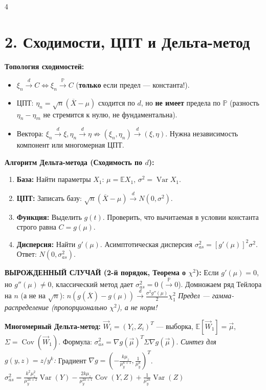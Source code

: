 \documentclass[8pt, a4paper, landscape]{extarticle}
\newcommand{\E}{\mathbb{E}}
\renewcommand{\P}{\mathbb{P}}
\DeclareMathOperator{\Var}{Var}
\DeclareMathOperator{\Cov}{Cov}
\begin{document}
\begin{multicols*}{4}
\section*{2. Сходимости, ЦПТ и Дельта-метод}
\textbf{Топология сходимостей:}
\begin{itemize}
    \item $\xi_n \xrightarrow{d} C \iff \xi_n \xrightarrow{\P} C$ (\textbf{только} если предел --- константа!).
    \item ЦПТ: $\eta_n = \sqrt{n}(\overline{X} - \mu)$ сходится по $d$, но \textbf{не имеет} предела по $\P$ (разность $\eta_n - \eta_m$ не стремится к нулю, не фундаментальна).
    \item Вектора: $\xi_n \xrightarrow{d} \xi, \eta_n \xrightarrow{d} \eta \not\Rightarrow (\xi_n, \eta_n) \xrightarrow{d} (\xi, \eta)$. Нужна независимость компонент или многомерная ЦПТ.
\end{itemize}

\textbf{Алгоритм Дельта-метода (Сходимость по $d$):}
\begin{enumerate}
    \item \textbf{База:} Найти параметры $X_1$: $\mu = \E X_1$, $\sigma^2 = \Var X_1$.
    \item \textbf{ЦПТ:} Записать базу: $\sqrt{n}(\overline{X} - \mu) \xrightarrow{d} N(0, \sigma^2)$.
    \item \textbf{Функция:} Выделить $g(t)$. Проверить, что вычитаемая в условии константа строго равна $C = g(\mu)$.
    \item \textbf{Дисперсия:} Найти $g'(\mu)$. Асимптотическая дисперсия $\sigma_{as}^2 = [g'(\mu)]^2 \sigma^2$. Ответ: $N(0, \sigma_{as}^2)$.
\end{enumerate}

\textbf{ВЫРОЖДЕННЫЙ СЛУЧАЙ (2-й порядок, Теорема о $\chi^2$):}
Если $g'(\mu)=0$, но $g''(\mu)\ne 0$, классический метод дает $\sigma_{as}^2=0$ ($\xrightarrow{\P} 0$). Домножаем ряд Тейлора на $n$ (а не на $\sqrt{n}$):
$ n(g(\overline{X}) - g(\mu)) \xrightarrow{d} \frac{\sigma^2 g''(\mu)}{2} \chi^2_1 $
\textit{Предел — гамма-распределение (пропорционально $\chi^2$), а не норм!}

\textbf{Многомерный Дельта-метод:} $\vec{W}_i=(Y_i, Z_i)^T$ --- выборка, $\E[\vec{W}_1]=\vec{\mu}$, $\Sigma = \Cov(\vec{W}_1)$. Формула: $\sigma_{as}^2 = \nabla g(\vec{\mu})^T \Sigma \nabla g(\vec{\mu})$.
\textit{Синтез для $g(y,z) = z/y^k$:} Градиент $\nabla g = \left(-\frac{k\mu_z}{\mu_y^{k+1}}, \frac{1}{\mu_y^k}\right)^T$.
$ \sigma^2_{as} = \frac{k^2 \mu_z^2}{\mu_y^{2k+2}} \Var(Y) - \frac{2k \mu_z}{\mu_y^{2k+1}} \Cov(Y, Z) + \frac{1}{\mu_y^{2k}} \Var(Z) $


\end{multicols*}
\end{document}
